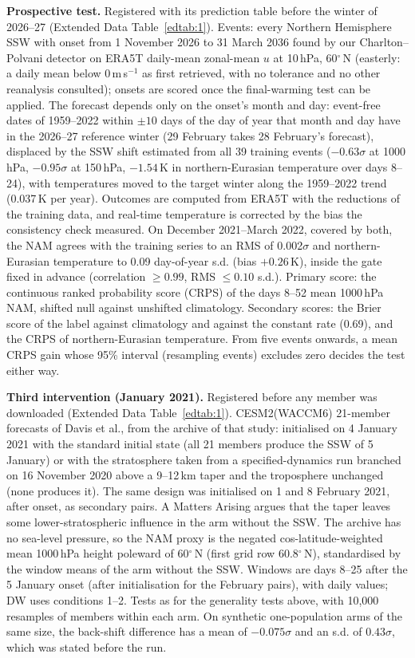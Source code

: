 \documentclass[11pt]{article}
\begin{document}
\textbf{Prospective test.} Registered with its prediction table before the winter of 2026--27 (Extended Data Table~\ref{edtab:1}). Events: every Northern Hemisphere SSW with onset from 1 November 2026 to 31 March 2036 found by our Charlton--Polvani detector on ERA5T daily-mean zonal-mean $u$ at 10\,hPa, 60$^\circ$\,N (easterly: a daily mean below 0\,m\,s$^{-1}$ as first retrieved, with no tolerance and no other reanalysis consulted); onsets are scored once the final-warming test can be applied. The forecast depends only on the onset's month and day: event-free dates of 1959--2022 within $\pm10$ days of the day of year that month and day have in the 2026--27 reference winter (29 February takes 28 February's forecast), displaced by the SSW shift estimated from all 39 training events ($-0.63\sigma$ at 1000\,hPa, $-0.95\sigma$ at 150\,hPa, $-1.54$\,K in northern-Eurasian temperature over days 8--24), with temperatures moved to the target winter along the 1959--2022 trend (0.037\,K per year). Outcomes are computed from ERA5T with the reductions of the training data, and real-time temperature is corrected by the bias the consistency check measured. On December 2021--March 2022, covered by both, the NAM agrees with the training series to an RMS of 0.002$\sigma$ and northern-Eurasian temperature to 0.09 day-of-year s.d. (bias $+0.26$\,K), inside the gate fixed in advance (correlation $\ge 0.99$, RMS $\le 0.10$ s.d.). Primary score: the continuous ranked probability score (CRPS) of the days 8--52 mean 1000\,hPa NAM, shifted null against unshifted climatology. Secondary scores: the Brier score of the label against climatology and against the constant rate (0.69), and the CRPS of northern-Eurasian temperature. From five events onwards, a mean CRPS gain whose 95\% interval (resampling events) excludes zero decides the test either way.

\textbf{Third intervention (January 2021).} Registered before any member was downloaded (Extended Data Table~\ref{edtab:1}). CESM2(WACCM6) 21-member forecasts of Davis et al.\cite{davis22}, from the archive of that study: initialised on 4 January 2021 with the standard initial state (all 21 members produce the SSW of 5 January) or with the stratosphere taken from a specified-dynamics run branched on 16 November 2020 above a 9--12\,km taper and the troposphere unchanged (none produces it). The same design was initialised on 1 and 8 February 2021, after onset, as secondary pairs. A Matters Arising argues that the taper leaves some lower-stratospheric influence in the arm without the SSW\cite{cohen23}. The archive has no sea-level pressure, so the NAM proxy is the negated cos-latitude-weighted mean 1000\,hPa height poleward of 60$^\circ$\,N (first grid row 60.8$^\circ$\,N), standardised by the window means of the arm without the SSW. Windows are days 8--25 after the 5 January onset (after initialisation for the February pairs), with daily values; DW uses conditions 1--2. Tests as for the generality tests above, with 10,000 resamples of members within each arm. On synthetic one-population arms of the same size, the back-shift difference has a mean of $-0.075\sigma$ and an s.d. of $0.43\sigma$, which was stated before the run.
\end{document}
